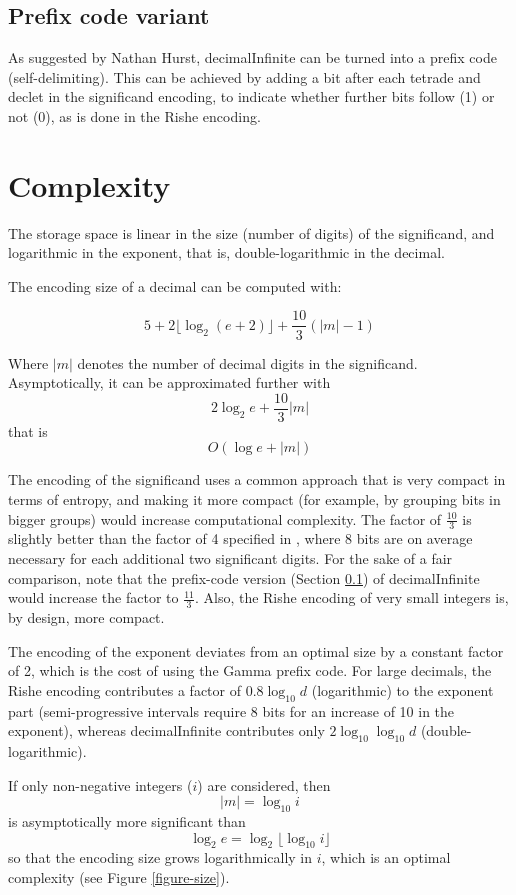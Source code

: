 \documentclass{acm_proc_article-sp}
\begin{document}
\subsection{Prefix code variant}
\label{section-prefix-code}

As suggested by Nathan Hurst, decimalInfinite can be turned into a prefix code (self-delimiting). This can be achieved by adding a bit after each tetrade and declet in the significand encoding, to indicate whether further bits follow (1) or not (0), as is done in the Rishe encoding.

\section{Complexity}
\label{section-complexity}
The storage space is linear in the size (number of digits) of the significand, and logarithmic in the exponent, that is, double-logarithmic in the decimal.

The encoding size of a decimal can be computed with:

$$5 + 2 \lfloor\log_2 (e+2)\rfloor + \frac{10}{3} (|m|-1)$$

Where $|m|$ denotes the number of decimal digits in the significand. Asymptotically, it can be approximated further with $$2 \log_2 e + \frac{10}{3}|m|$$ that is $$O(\log e + |m|)$$

The encoding of the significand uses a common approach that is very compact in terms of entropy, and making it more compact (for example, by grouping bits in bigger groups) would increase computational complexity. The factor of $\frac{10}{3}$ is slightly better than the factor of 4 specified in \cite{Rishe1992}, where 8 bits are on average necessary for each additional two significant digits. For the sake of a fair comparison, note that the prefix-code version (Section \ref{section-prefix-code}) of decimalInfinite would increase the factor to $\frac{11}{3}$. Also, the Rishe encoding of very small integers is, by design, more compact.

The encoding of the exponent deviates from an optimal size by a constant factor of 2, which is the cost of using the Gamma prefix code. For large decimals, the Rishe encoding contributes a factor of $0.8 \log_{10} d$ (logarithmic) to the exponent part (semi-progressive intervals require 8 bits for an increase of 10 in the exponent), whereas decimalInfinite contributes only $2 \log_{10}\log_{10} d$ (double-logari\-thmic).

If only non-negative integers ($i$) are considered, then $$|m|= \log_{10} i$$ is asymptotically more significant than $$\log_2 e=\log_2\lfloor\log_{10} i\rfloor$$ so that the encoding size grows logarithmically in $i$, which is an optimal complexity (see Figure \ref{figure-size}).
\end{document}
